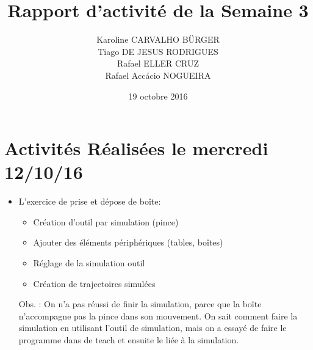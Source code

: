 \documentclass[11pt,a4paper,onecolumn]{articlewithlogo}
\title{Rapport d'activité de la Semaine 3}
\author{Karoline CARVALHO BÜRGER\\ Tiago DE JESUS RODRIGUES\\  Rafael ELLER CRUZ \\  Rafael Accácio NOGUEIRA }
\date{19 octobre 2016}
\begin{document}
\maketitle
\section{Activités Réalisées le mercredi 12/10/16  }
\begin{itemize}
	\renewcommand\labelitemi{$\circ$}
	\item L’exercice de prise et dépose de boîte:
		\begin{itemize}
	\item Création d’outil par simulation (pince)
	\item 	Ajouter des éléments périphériques (tables, boîtes)
	\item 	Réglage de la simulation outil
	\item 	Création de trajectoires simulées
		\end{itemize}
	\vspace{1cm}
	 Obs. : On n’a pas réussi de finir la simulation, parce que la boîte n’accompagne pas la pince dans son mouvement. On sait comment faire la simulation en utilisant l’outil de simulation, mais on a essayé de faire le programme dans de teach et ensuite le liée à la simulation.
	
\end{itemize}


%
\end{document}

